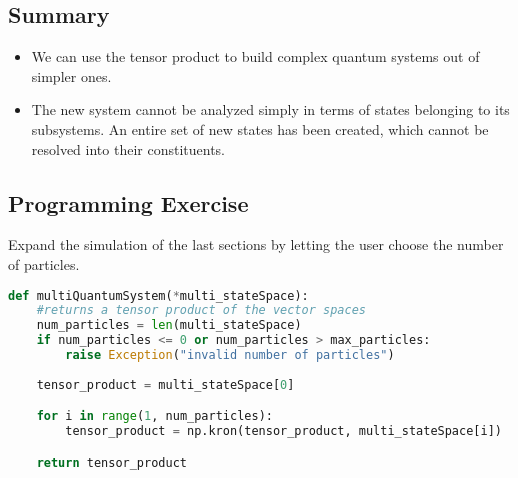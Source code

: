 \documentclass{article}
\begin{document}
\subsection{Summary}

\begin{itemize}
    \item We can use the tensor product to build complex quantum systems out of simpler ones.
    \item The new system cannot be analyzed simply in terms of states belonging to its subsystems. An entire set of new states has been created, which cannot be resolved into their constituents.
\end{itemize}

\subsection{Programming Exercise}
Expand the simulation of the last sections by letting the user choose the number of particles.\\
\begin{lstlisting}[language=Python]
def multiQuantumSystem(*multi_stateSpace):
    #returns a tensor product of the vector spaces
    num_particles = len(multi_stateSpace)
    if num_particles <= 0 or num_particles > max_particles:
        raise Exception("invalid number of particles")
    
    tensor_product = multi_stateSpace[0]

    for i in range(1, num_particles):
        tensor_product = np.kron(tensor_product, multi_stateSpace[i])

    return tensor_product
\end{lstlisting}
\end{document}
